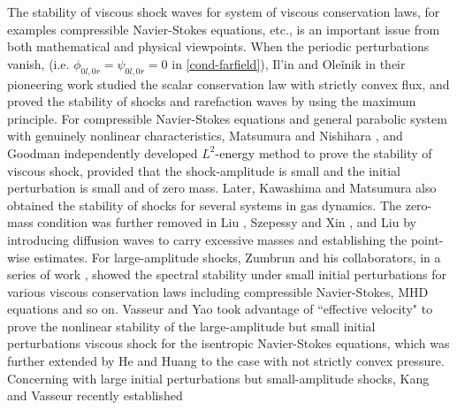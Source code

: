 \documentclass[12pt,reqno]{amsart}
\numberwithin{equation}{section}
\begin{document}
The stability of viscous shock waves for system of viscous conservation laws, for examples compressible Navier-Stokes equations, etc., is an important issue from both mathematical and physical viewpoints. 
When the periodic perturbations vanish, (i.e. $\phi_{0l,0r}=\psi_{0l,0r}=0$ in \eqref{cond-farfield}),  Il'in and Ole\v inik in their pioneering work \cite{Oleinik.1960} studied the scalar conservation law with strictly convex flux, and proved the stability of shocks and rarefaction waves by using the maximum principle. For compressible Navier-Stokes equations and general parabolic system with genuinely nonlinear characteristics, Matsumura and Nishihara \cite{zero-mass},
and Goodman \cite{Goodman.1986} independently developed $L^2$-energy method to prove the stability of viscous shock, provided that the shock-amplitude is small and the initial perturbation is small and of zero mass. Later, Kawashima and Matsumura \cite{MatsumuraCMP} also obtained the stability of shocks for several systems in gas dynamics.
The zero-mass condition was further removed in Liu \cite{Liu1}, Szepessy and Xin \cite{Xin1}, and  Liu \cite{Liu2}  by introducing diffusion
waves to carry excessive masses and establishing the point-wise estimates. For large-amplitude shocks, Zumbrun and his collaborators, in a series of work \cite{Zumbrun1998,Mascia2004, Zumbrun2009,Zumbrun2017,Zumbrun2016}, showed the spectral stability under small initial perturbations for various viscous conservation laws including compressible Navier-Stokes, MHD equations and so on.
Vasseur and Yao \cite{Yao.2016} took advantage of
``effective velocity" to prove the nonlinear stability of the large-amplitude but  small initial perturbations viscous shock for the isentropic Navier-Stokes
equations, which was further extended by He and Huang \cite{HehuangJDE} to the case with not strictly convex pressure. Concerning with large initial perturbations but small-amplitude shocks, Kang and Vasseur recently established
\end{document}
